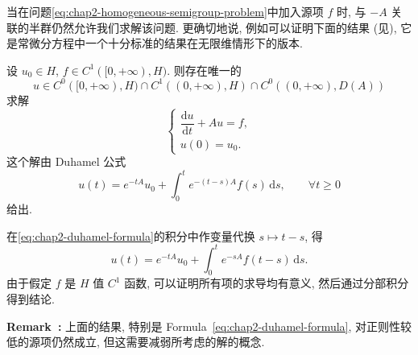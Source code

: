 当在问题\eqref{eq:chap2-homogeneous-semigroup-problem}中加入源项 $f$ 时, 与 $-A$ 关联的半群仍然允许我们求解该问题. 更确切地说, 例如可以证明下面的结果 (见), 它是常微分方程中一个十分标准的结果在无限维情形下的版本.

\begin{Theorem}
\label{thm:chap2-duhamel-semigroup}
设 $u_0\in H$, $f\in C^1([0,+\infty),H)$. 则存在唯一的
\[
 u\in C^0([0,+\infty),H)\cap C^1((0,+\infty),H)\cap C^0((0,+\infty),D(A))
\]
求解
\begin{equation}
 \begin{cases}
 \dfrac{\mathrm du}{\mathrm dt}+Au=f,\\
 u(0)=u_0.
 \end{cases}
 \label{eq:chap2-inhomogeneous-semigroup-problem}
\end{equation}
这个解由 Duhamel 公式
\begin{equation}
 u(t)=e^{-tA}u_0+\int_0^te^{-(t-s)A}f(s)\,\mathrm ds,
 \qquad\forall t\geq0
 \label{eq:chap2-duhamel-formula}
\end{equation}
给出.
\end{Theorem}

\begin{Proof}
在\eqref{eq:chap2-duhamel-formula}的积分中作变量代换 $s\mapsto t-s$, 得
\[
 u(t)=e^{-tA}u_0+\int_0^te^{-sA}f(t-s)\,\mathrm ds.
\]
由于假定 $f$ 是 $H$ 值 $C^1$ 函数, 可以证明所有项的求导均有意义, 然后通过分部积分得到结论.
\end{Proof}

\par\noindent{}\textbf{Remark~\thechaptersixremark:}\label{rem:chap2-duhamel-low-regularity}\quad
上面的结果, 特别是 Formula~\eqref{eq:chap2-duhamel-formula}, 对正则性较低的源项仍然成立, 但这需要减弱所考虑的解的概念.
